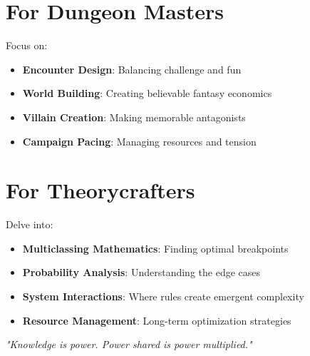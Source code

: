 \documentclass[11pt,letterpaper,openany]{book}
\newcommand{\fantasyquote}[1]{%
\begin{center}
\textit{\large #1}
\end{center}
}
\begin{document}
\section*{For Dungeon Masters}

Focus on:
\begin{itemize}
    \item \textbf{Encounter Design}: Balancing challenge and fun
    \item \textbf{World Building}: Creating believable fantasy economics
    \item \textbf{Villain Creation}: Making memorable antagonists
    \item \textbf{Campaign Pacing}: Managing resources and tension
\end{itemize}

\section*{For Theorycrafters}

Delve into:
\begin{itemize}
    \item \textbf{Multiclassing Mathematics}: Finding optimal breakpoints
    \item \textbf{Probability Analysis}: Understanding the edge cases
    \item \textbf{System Interactions}: Where rules create emergent complexity
    \item \textbf{Resource Management}: Long-term optimization strategies
\end{itemize}

\fantasyquote{"Knowledge is power. Power shared is power multiplied."}
\end{document}
